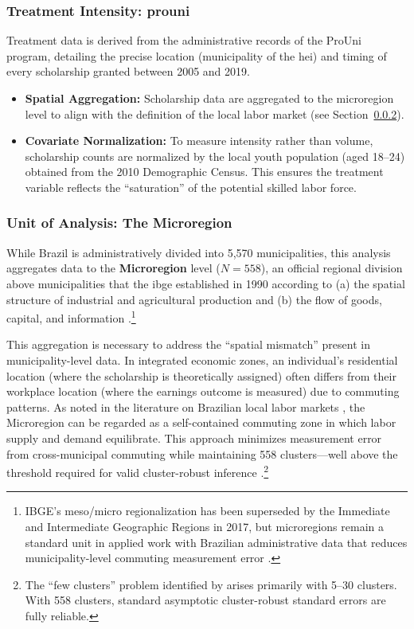 \subsubsection{Treatment Intensity: \acrshort{prouni}}
Treatment data is derived from the administrative records of the ProUni program, detailing the precise location (municipality of the \acrshort{hei}) and timing of every scholarship granted between 2005 and 2019.
\begin{itemize}
    \item \textbf{Spatial Aggregation:} Scholarship data are aggregated to the microregion level to align with the definition of the local labor market (see Section~\ref{sec:unit_analysis}).
    \item \textbf{Covariate Normalization:} To measure intensity rather than volume, scholarship counts are normalized by the local youth population (aged 18--24) obtained from the 2010 Demographic Census. This ensures the treatment variable reflects the ``saturation'' of the potential skilled labor force.
\end{itemize}

\subsubsection{Unit of Analysis: The Microregion}
\label{sec:unit_analysis}

While Brazil is administratively divided into 5,570 municipalities, this analysis aggregates data to the \textbf{Microregion} level ($N = 558$), an official regional division above municipalities that the \acrshort{ibge} established in 1990 according to (a) the spatial structure of industrial and agricultural production and (b) the flow of goods, capital, and information \cite{IBGE_QGR_2022}.\footnote{IBGE's meso/micro regionalization has been superseded by the Immediate and Intermediate Geographic Regions in 2017, but microregions remain a standard unit in applied work with Brazilian administrative data that reduces municipality-level commuting measurement error \cite{IBGE_QGR_2022}.}

This aggregation is necessary to address the ``spatial mismatch'' present in municipality-level data. In integrated economic zones, an individual's residential location (where the scholarship is theoretically assigned) often differs from their workplace location (where the earnings outcome is measured) due to commuting patterns. As noted in the literature on Brazilian local labor markets \cite{DixCarneiro2018}, the Microregion can be regarded as a self-contained commuting zone in which labor supply and demand equilibrate. This approach minimizes measurement error from cross-municipal commuting while maintaining 558 clusters---well above the threshold required for valid cluster-robust inference \cite{CameronMiller2015}.\footnote{The ``few clusters'' problem identified by  arises primarily with 5--30 clusters. With 558 clusters, standard asymptotic cluster-robust standard errors are fully reliable.}

